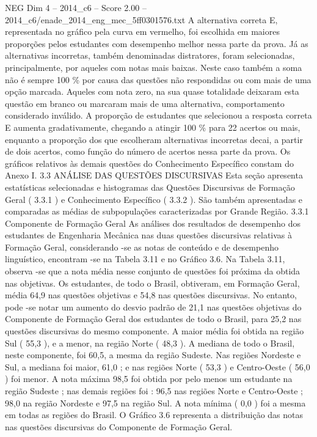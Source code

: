 \begin{textsample}{NEG Dim 4 – 2014\_c6 – Score 2.00 – 2014\_c6/enade\_2014\_eng\_mec\_5ff0301576.txt}
A alternativa correta E, representada no gráfico pela curva em vermelho, foi escolhida em maiores proporções pelos estudantes com desempenho melhor nessa parte da prova.
Já as alternativas incorretas, também denominadas distratores, foram selecionadas, principalmente, por aqueles com notas mais baixas.
Neste caso também a soma não é sempre 100 \% por causa das questões não respondidas ou com mais de uma opção marcada.
Aqueles com nota zero, na sua quase totalidade deixaram esta questão em branco ou marcaram mais de uma alternativa, comportamento considerado inválido.
A proporção de estudantes que selecionou a resposta correta E aumenta gradativamente, chegando a atingir 100 \% para 22 acertos ou mais, enquanto a proporção dos que escolheram alternativas incorretas decai, a partir de dois acertos, como função do número de acertos nessa parte da prova.
Os gráficos relativos às demais questões do Conhecimento Específico constam do Anexo I. 3.3 ANÁLISE DAS QUESTÕES DISCURSIVAS Esta seção apresenta estatísticas selecionadas e histogramas das Questões Discursivas de Formação Geral ( 3.3.1 ) e Conhecimento Específico ( 3.3.2 ).
São também apresentadas e comparadas as médias de subpopulações caracterizadas por Grande Região. 3.3.1 Componente de Formação Geral As análises dos resultados de desempenho dos estudantes de Engenharia Mecânica nas duas questões discursivas relativas à Formação Geral, considerando -se as notas de conteúdo e de desempenho linguístico, encontram -se na Tabela 3.11 e no Gráfico 3.6.
Na Tabela 3.11, observa -se que a nota média nesse conjunto de questões foi próxima da obtida nas objetivas.
Os estudantes, de todo o Brasil, obtiveram, em Formação Geral, média 64,9 nas questões objetivas e 54,8 nas questões discursivas.
No entanto, pode -se notar um aumento do desvio padrão de 21,1 nas questões objetivas do Componente de Formação Geral dos estudantes de todo o Brasil, para 25,2 nas questões discursivas do mesmo componente.
A maior média foi obtida na região Sul ( 55,3 ), e a menor, na região Norte ( 48,3 ).
A mediana de todo o Brasil, neste componente, foi 60,5, a mesma da região Sudeste.
Nas regiões Nordeste e Sul, a mediana foi maior, 61,0 ; e nas regiões Norte ( 53,3 ) e Centro-Oeste ( 56,0 ) foi menor.
A nota máxima 98,5 foi obtida por pelo menos um estudante na região Sudeste ; nas demais regiões foi : 96,5 nas regiões Norte e Centro-Oeste ; 98,0 na região Nordeste e 97,5 na região Sul.
A nota mínima ( 0,0 ) foi a mesma em todas as regiões do Brasil.
O Gráfico 3.6 representa a distribuição das notas nas questões discursivas do Componente de Formação Geral.

\end{textsample}
